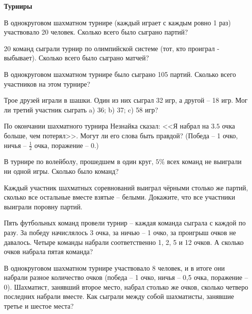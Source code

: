 \documentclass{article}
\begin{document}
    \large

    \begin{center}
        \textbf{Турниры}
    \end{center}

    \begin{enumerate_boxed}

        \item В однокруговом шахматном турнире (каждый играет с каждым ровно 1 раз) участвовало 20 человек.
        Сколько всего было сыграно партий?

        \item 20 команд сыграли турнир по олимпийской системе (тот, кто проиграл - выбывает).
        Сколько всего было сыграно матчей?

        \item В однокруговом шахматном турнире было сыграно 105 партий.
        Сколько всего участников на этом турнире?

        \item Трое друзей играли в шашки.
        Один из них сыграл 32 игр, а другой – 18 игр.
        Мог ли третий участник сыграть a) 36; b) 37; c) 58 игр?

        \item По окончании шахматного турнира Незнайка сказал: <<Я набрал на $3.5$ очка больше, чем потерял>>.
        Могут ли его слова быть правдой?
        (Победа – 1 очко, ничья – $\frac{1}{2}$ очка, поражение – 0.)

        \item В турнире по волейболу, прошедшем в один круг, $5\%$ всех команд не выиграли ни одной игры.
        Сколько было команд?

        \item Каждый участник шахматных соревнований выиграл чёрными столько же партий, сколько все остальные вместе взятые – белыми.
        Докажите, что все участники выиграли поровну партий.

        \item  Пять футбольных команд провели турнир – каждая команда сыграла с каждой по разу.
        За победу начислялось 3 очка, за ничью – 1 очко, за проигрыш очков не давалось.
        Четыре команды набрали соответственно 1, 2, 5 и 12 очков.
        А сколько очков набрала пятая команда?

        \item В однокруговом шахматном турнире участвовало 8 человек, и в итоге они набрали разное количество очков (победа – 1 очко, ничья – 0,5 очка, поражение – 0).
        Шахматист, занявший второе место, набрал столько же очков, сколько четверо последних набрали вместе.
        Как сыграли между собой шахматисты, занявшие третье и шестое места?


\end{enumerate_boxed}
\end{document}
